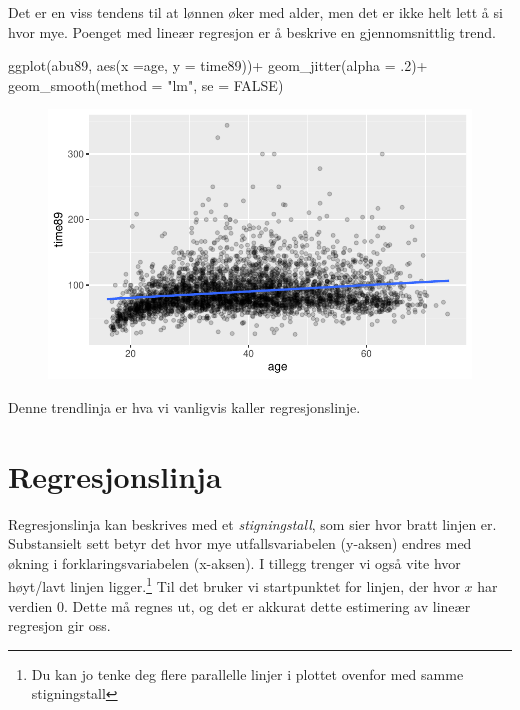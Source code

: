 \documentclass[
  letterpaper,
  DIV=11,
  numbers=noendperiod]{scrreprt}
\newenvironment{Shaded}{\begin{snugshade}}{\end{snugshade}}
\newcommand{\AttributeTok}[1]{\textcolor[rgb]{0.40,0.45,0.13}{#1}}
\newcommand{\ConstantTok}[1]{\textcolor[rgb]{0.56,0.35,0.01}{#1}}
\newcommand{\DecValTok}[1]{\textcolor[rgb]{0.68,0.00,0.00}{#1}}
\newcommand{\FunctionTok}[1]{\textcolor[rgb]{0.28,0.35,0.67}{#1}}
\newcommand{\NormalTok}[1]{\textcolor[rgb]{0.00,0.23,0.31}{#1}}
\newcommand{\SpecialCharTok}[1]{\textcolor[rgb]{0.37,0.37,0.37}{#1}}
\newcommand{\StringTok}[1]{\textcolor[rgb]{0.13,0.47,0.30}{#1}}
\theoremstyle{definition}
\theoremstyle{remark}
\begin{document}
Det er en viss tendens til at lønnen øker med alder, men det er ikke
helt lett å si hvor mye. Poenget med lineær regresjon er å beskrive en
gjennomsnittlig trend.

\begin{Shaded}
\begin{Highlighting}[]
\FunctionTok{ggplot}\NormalTok{(abu89, }\FunctionTok{aes}\NormalTok{(}\AttributeTok{x =}\NormalTok{age, }\AttributeTok{y =}\NormalTok{ time89))}\SpecialCharTok{+}
  \FunctionTok{geom\_jitter}\NormalTok{(}\AttributeTok{alpha =}\NormalTok{ .}\DecValTok{2}\NormalTok{)}\SpecialCharTok{+}
  \FunctionTok{geom\_smooth}\NormalTok{(}\AttributeTok{method =} \StringTok{"lm"}\NormalTok{, }\AttributeTok{se =} \ConstantTok{FALSE}\NormalTok{)}
\end{Highlighting}
\end{Shaded}

\begin{figure}[H]

{\centering \includegraphics{./linearRegresjon_files/figure-pdf/unnamed-chunk-5-1.pdf}

}

\end{figure}

Denne trendlinja er hva vi vanligvis kaller regresjonslinje.

\hypertarget{regresjonslinja}{%
\section{Regresjonslinja}\label{regresjonslinja}}

Regresjonslinja kan beskrives med et \emph{stigningstall}, som sier hvor
bratt linjen er. Substansielt sett betyr det hvor mye utfallsvariabelen
(y-aksen) endres med økning i forklaringsvariabelen (x-aksen). I tillegg
trenger vi også vite hvor høyt/lavt linjen ligger.\footnote{Du kan jo
  tenke deg flere parallelle linjer i plottet ovenfor med samme
  stigningstall} Til det bruker vi startpunktet for linjen, der hvor
\(x\) har verdien 0. Dette må regnes ut, og det er akkurat dette
estimering av lineær regresjon gir oss.
\end{document}
